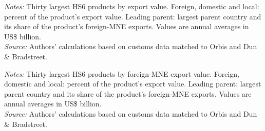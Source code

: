\documentclass[11pt,a4paper]{article}
\begin{document}
\begin{table}[H]\centering\footnotesize%
  \caption{Mining and Fuels: Thirty Largest Export Products}%
  \label{tab:hs_by_value_mining}%
  \par\vspace{3pt}%
  \begin{minipage}{0.95\textwidth}\footnotesize %
  \textit{Notes:} Thirty largest HS6 products by export value. Foreign, domestic and local: percent of the product's export value. Leading parent: largest parent country and its share of the product's foreign-MNE exports. Values are annual averages in US\$ billion.\\[3pt]%
  \textit{Source:} Authors' calculations based on customs data matched to Orbis and Dun \& Bradstreet.%
  \end{minipage}%
  \end{table}
\begin{table}[H]\centering\footnotesize%
  \caption{Mining and Fuels: Thirty Largest Export Products of Foreign Multinationals}%
  \label{tab:hs_by_foreign_value_mining}%
  \par\vspace{3pt}%
  \begin{minipage}{0.95\textwidth}\footnotesize %
  \textit{Notes:} Thirty largest HS6 products by foreign-MNE export value. Foreign, domestic and local: percent of the product's export value. Leading parent: largest parent country and its share of the product's foreign-MNE exports. Values are annual averages in US\$ billion.\\[3pt]%
  \textit{Source:} Authors' calculations based on customs data matched to Orbis and Dun \& Bradstreet.%
  \end{minipage}%
  \end{table}
\end{document}
